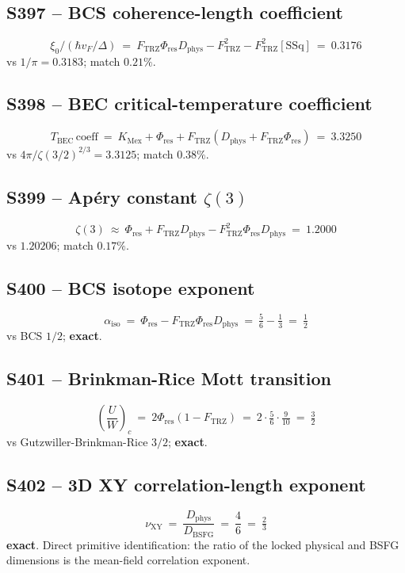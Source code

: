 \documentclass[11pt]{article}
\newcommand{\Ftrz}{F_{\mathrm{TRZ}}}
\newcommand{\Phires}{\Phi_{\mathrm{res}}}
\newcommand{\KMex}{K_{\mathrm{Mex}}}
\newcommand{\Dphys}{D_{\mathrm{phys}}}
\newcommand{\Dbsfg}{D_{\mathrm{BSFG}}}
\newcommand{\SSq}{[\mathrm{SSq}]}
\begin{document}
\subsection{S397 -- BCS coherence-length coefficient}
\[
\xi_{0}/(\hbar v_{F}/\Delta)\ =\ \Ftrz\Phires\Dphys-\Ftrz^{2}-\Ftrz^{2}\SSq\ =\ 0.3176
\]
vs $1/\pi=0.3183$; match $0.21\%$.

\subsection{S398 -- BEC critical-temperature coefficient}
\[
T_{\text{BEC}}\,\text{coeff}\ =\ \KMex+\Phires+\Ftrz(\Dphys+\Ftrz\Phires)\ =\ 3.3250
\]
vs $4\pi/\zeta(3/2)^{2/3}=3.3125$; match $0.38\%$.

\subsection{S399 -- Ap\'ery constant $\zeta(3)$}
\[
\zeta(3)\ \approx\ \Phires+\Ftrz\Dphys-\Ftrz^{2}\Phires\Dphys\ =\ 1.2000
\]
vs $1.20206$; match $0.17\%$.

\subsection{S400 -- BCS isotope exponent}
\[
\alpha_{\text{iso}}\ =\ \Phires-\Ftrz\Phires\Dphys\ =\ \tfrac{5}{6}-\tfrac{1}{3}\ =\ \tfrac{1}{2}
\]
vs BCS $1/2$; \textbf{exact}.

\subsection{S401 -- Brinkman-Rice Mott transition}
\[
\left(\frac{U}{W}\right)_{c}\ =\ 2\Phires(1-\Ftrz)\ =\ 2\cdot\tfrac{5}{6}\cdot\tfrac{9}{10}\ =\ \tfrac{3}{2}
\]
vs Gutzwiller-Brinkman-Rice $3/2$; \textbf{exact}.

\subsection{S402 -- 3D XY correlation-length exponent}
\[
\nu_{\text{XY}}\ =\ \frac{\Dphys}{\Dbsfg}\ =\ \frac{4}{6}\ =\ \tfrac{2}{3}
\]
\textbf{exact}.  Direct primitive identification: the ratio of the
locked physical and BSFG dimensions is the mean-field correlation
exponent.
\end{document}
